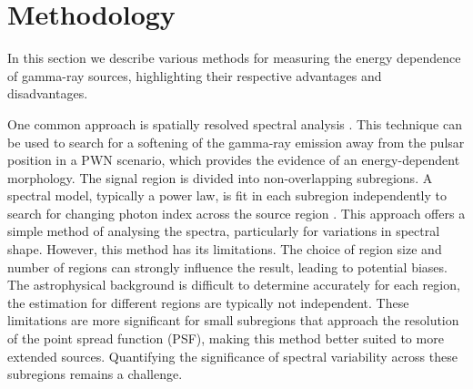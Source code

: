 \documentclass{aa}
\begin{document}
\section{Methodology}
\label{sec:methods}
In this section we describe various methods for measuring the energy dependence of gamma-ray sources, highlighting their respective advantages and disadvantages. 

One common approach is spatially resolved spectral analysis \citep{Aharonian_2006,2006_RXJ}. This technique can be used to search for a softening of the gamma-ray emission away from the pulsar position in a PWN scenario, which provides the evidence of an energy-dependent morphology.
The signal region is divided into non-overlapping subregions. A spectral model, typically a power law, is fit in each subregion independently to search for changing photon index across the source region \citep{2006_RXJ}. This approach offers a simple method of analysing the spectra, particularly for variations in spectral shape. However, this method has its limitations. The choice of region size and number of regions can strongly influence the result, leading to potential biases. The astrophysical background is difficult to determine accurately for each region, the estimation for different regions are typically not independent. These limitations are more significant for small subregions that approach the resolution of the point spread function (PSF), making this method better suited to more extended sources. Quantifying the significance of spectral variability across these subregions remains a challenge.
\end{document}
